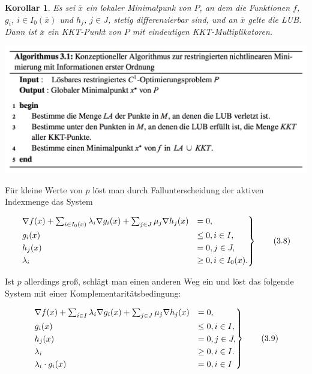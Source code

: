 \documentclass[11pt]{scrreprt}
\newcounter{thm}
\theoremstyle{thmstyle}
\numberwithin{thm}{section}
\newtheorem{korollar}[thm]{Korollar}
\begin{document}
\begin{korollar}
	Es sei $\overline{x}$ ein lokaler Minimalpunk von $P$, an dem die Funktionen $f$, $g_i$, $i \in I_0(\overline{x})$ und $h_j$, $j \in J$, stetig differenzierbar sind, und an $\overline{x}$ gelte die LUB. Dann ist $\overline{x}$ ein KKT-Punkt von $P$ mit eindeutigen KKT-Multiplikatoren.
\end{korollar}

\begin{center}
	\includegraphics[scale=0.5]{a31}
\end{center}
 
Für kleine Werte von $p$ löst man durch Fallunterscheidung der aktiven Indexmenge das System

\begin{equation}
	\begin{rcases}
	\nabla f(x) + \sum_{i \in I_0(x)} \lambda_i \nabla g_i(x) + \sum_{j \in J} \mu_j \nabla h_j(x) & = 0, \\
	g_i(x) & \leq 0, i \in I, \\
	h_j(x) & = 0, j \in J, \\
	\lambda_i & \geq 0, i \in I_0(x).
\end{rcases} \tag*{(3.8)}
\end{equation}

Ist $p$ allerdings groß, schlägt man einen anderen Weg ein und löst das folgende System mit einer Komplementaritätsbedingung:

\begin{equation}
	\begin{rcases}
	\nabla f(x) + \sum_{i \in I} \lambda_i \nabla g_i(x) + \sum_{j \in J} \mu_j \nabla h_j(x) & = 0, \\
	g_i(x) & \leq 0, i \in I, \\
	h_j(x) & = 0, j \in J, \\
	\lambda_i & \geq 0, i \in I. \\
	\lambda_i \cdot g_i(x) & = 0, i \in I
\end{rcases} \tag*{(3.9)}
\end{equation}
\end{document}
